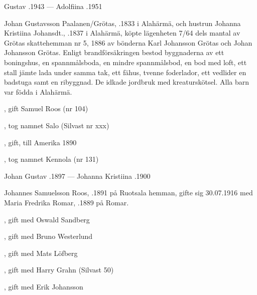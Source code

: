 Gustav .1943  ---  Adolfiina .1951


Johan Gustavsson Paalanen/Grötas, .1833 i Alahärmä, och hustrun Johanna Kristiina Johansdt., .1837 i Alahärmä, köpte lägenheten 7/64 dels mantal av Grötas skattehemman  nr 5, 1886 av bönderna Karl Johansson Grötas och Johan Johansson Grötas. Enligt brandförsäkringen bestod byggnaderna av ett boningshus, en spannmålsboda, en mindre spannmålsbod, en bod med loft, ett stall jämte lada under samma tak, ett fähus, tvenne foderlador, ett vedlider en badstuga samt en ribyggnad. De idkade jordbruk med kreaturskötsel. Alla barn var födda i Alahärmä.
\begin{jhchildren}
  \item {}
  \item {}, gift Samuel Roos (nr 104)
  \item {}, tog namnet Salo (Silvast nr xxx)
  \item {}, gift, till Amerika 1890
  \item {}
  \item {}, tog namnet Kennola (nr 131)
\end{jhchildren}
Johan Gustav .1897  ---  Johanna Kristiina .1900






Johannes Samuelsson Roos, .1891 på Ruotsala hemman, gifte sig 30.07.1916 med Maria Fredrika Romar, .1889 på Romar.
\begin{jhchildren}
  \item {}, gift med Oswald Sandberg
  \item {}, gift med Bruno Westerlund
  \item {}, gift med Mats Löfberg
  \item {}, gift med Harry Grahn (Silvast 50)
  \item {}, gift med Erik Johansson
\end{jhchildren}

